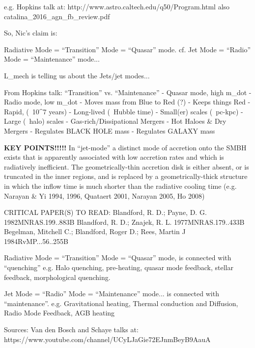 
e.g.
Hopkins talk at:
http://www.astro.caltech.edu/q50/Program.html
also 
catalina_2016_agn_fb_review.pdf

So, Nic's claim is:

Radiative Mode = ``Transition'' Mode = ``Quasar'' mode. 
   cf. 
Jet Mode = ``Radio'' Mode = ``Maintenance'' mode...


L_mech is telling us about the Jets/jet modes...


From Hopkins talk:
   ``Transition''                    vs.           ``Maintenance'' 
- Quasar mode, high m_dot                        - Radio mode, low m_dot
- Moves mass from Blue to Red (?)                - Keeps things Red
- Rapid, (~10^7 years)                           - Long-lived (~Hubble time)
- Small(er) scales (~pc-kpc)                     - Large (~halo) scales
- Gas-rich/Dissipational Mergers                 - Hot Haloes \& Dry Mergers
- Regulates BLACK HOLE mass                      - Regulates GALAXY mass


{\bf KEY POINTS!!!!!}
In ``jet-mode'' a distinct mode of accretion onto the SMBH exists that is apparently associated with low accretion rates and which is radiatively inefficient. The geometrically-thin accretion disk is either absent, or is truncated in the inner regions, and is replaced by a geometrically-thick structure in which the inflow time is much shorter than the radiative cooling time (e.g. Narayan \& Yi 1994, 1996, Quataert 2001, Narayan 2005, Ho 2008)

CRITICAL PAPER(S) TO READ:  
Blandford, R. D.; Payne, D. G.
 1982MNRAS.199..883B
Blandford, R. D.; Znajek, R. L.
 1977MNRAS.179..433B
Begelman, Mitchell C.; Blandford, Roger D.; Rees, Martin J
 1984RvMP...56..255B


Radiative Mode = ``Transition'' Mode = ``Quasar'' mode, 
is connected with ``quenching'' 
e.g. Halo quenching, pre-heating, quasar mode feedback, stellar feedback, morphological quenching. 

Jet Mode = ``Radio'' Mode = ``Maintenance'' mode...
is connected with ``maintenance''. 
e.g. Gravitational heating, Thermal conduction and Diffusion, Radio Mode Feedback, AGB heating

Sources: 
Van den Bosch and Schaye talks at:
https://www.youtube.com/channel/UCyLJaGie72EJnmBeyB9AauA



